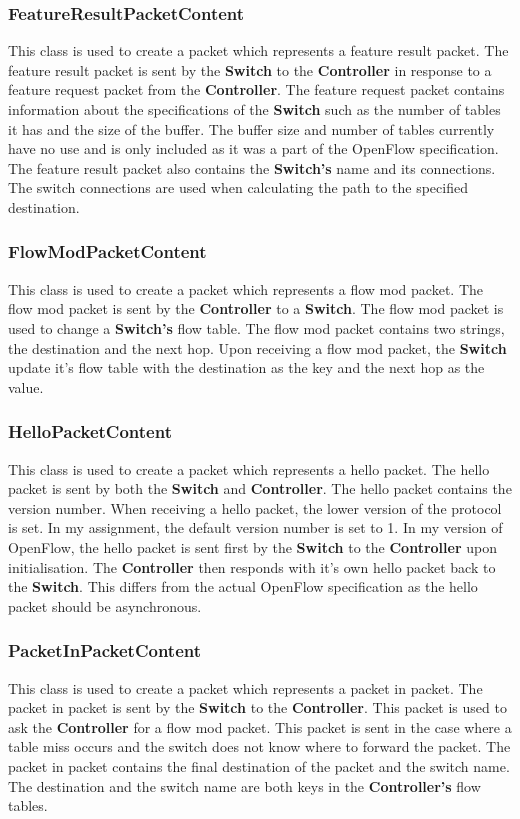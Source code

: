 \documentclass{article}
\begin{document}
\subsubsection{FeatureResultPacketContent}
This class is used to create a packet which represents a feature result packet.
The feature result packet is sent by the \textbf{Switch} to the
\textbf{Controller} in response to a feature request packet from the
\textbf{Controller}. The feature request packet contains information about the
specifications of the \textbf{Switch} such as the number of tables it has and
the size of the buffer. The buffer size and number of tables currently have no
use and is only included as it was a part of the OpenFlow specification. The
feature result packet also contains the \textbf{Switch's} name and its
connections. The switch connections are used when calculating the path to the
specified destination.

\subsubsection{FlowModPacketContent}
This class is used to create a packet which represents a flow mod packet. The
flow mod packet is sent by the \textbf{Controller} to a \textbf{Switch}. The
flow mod packet is used to change a \textbf{Switch's} flow table. The flow mod
packet contains two strings, the destination and the next hop. Upon receiving a
flow mod packet, the \textbf{Switch} update it's flow table with the destination
as the key and the next hop as the value.

\subsubsection{HelloPacketContent}
This class is used to create a packet which represents a hello packet. The hello
packet is sent by both the \textbf{Switch} and \textbf{Controller}. The hello
packet contains the version number. When receiving a hello packet, the lower
version of the protocol is set. In my assignment, the default version number
is set to 1. In my version of OpenFlow, the hello packet is sent first by the
\textbf{Switch} to the \textbf{Controller} upon initialisation. The
\textbf{Controller} then responds with it's own hello packet back to the
\textbf{Switch}. This differs from the actual OpenFlow specification as the
hello packet should be asynchronous.

\subsubsection{PacketInPacketContent}
This class is used to create a packet which represents a packet in packet. The
packet in packet is sent by the \textbf{Switch} to the \textbf{Controller}.
This packet is used to ask the \textbf{Controller} for a flow mod packet. This
packet is sent in the case where a table miss occurs and the switch does not
know where to forward the packet. The packet in packet contains the final
destination of the packet and the switch name. The destination and the switch
name are both keys in the \textbf{Controller's} flow tables.
\end{document}
